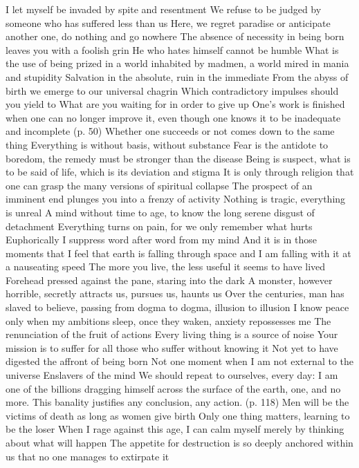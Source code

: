 \documentclass{article}
\begin{document}
I let myself be invaded by spite and resentment
We refuse to be judged by someone who has suffered less than us
Here, we regret paradise or anticipate another one, do nothing and go nowhere
The absence of necessity in being born leaves you with a foolish grin
He who hates himself cannot be humble
What is the use of being prized in a world inhabited by madmen, a world mired in mania and stupidity
Salvation in the absolute, ruin in the immediate
From the abyss of birth we emerge to our universal chagrin
Which contradictory impulses should you yield to
What are you waiting for in order to give up
One's work is finished when one can no longer improve it, even though one knows it to be inadequate and incomplete (p. 50)
Whether one succeeds or not comes down to the same thing
Everything is without basis, without substance
Fear is the antidote to boredom, the remedy must be stronger than the disease
Being is suspect, what is to be said of life, which is its deviation and stigma
It is only through religion that one can grasp the many versions of spiritual collapse
The prospect of an imminent end plunges you into a frenzy of activity
Nothing is tragic, everything is unreal
A mind without time to age, to know the long serene disgust of detachment
Everything turns on pain, for we only remember what hurts
Euphorically I suppress word after word from my mind
And it is in those moments that I feel that earth is falling through space and I am falling with it at a nauseating speed
The more you live, the less useful it seems to have lived
Forehead pressed against the pane, staring into the dark
A monster, however horrible, secretly attracts us, pursues us, haunts us
Over the centuries, man has slaved to believe, passing from dogma to dogma, illusion to illusion
I know peace only when my ambitions sleep, once they waken, anxiety repossesses me
The renunciation of the fruit of actions
Every living thing is a source of noise
Your mission is to suffer for all those who suffer without knowing it
Not yet to have digested the affront of being born
Not one moment when I am not external to the universe
Enslavers of the mind
We should repeat to ourselves, every day: I am one of the billions dragging himself across the surface of the earth, one, and no more. This banality justifies any conclusion, any action. (p. 118)
Men will be the victims of death as long as women give birth
Only one thing matters, learning to be the loser
When I rage against this age, I can calm myself merely by thinking about what will happen
The appetite for destruction is so deeply anchored within us that no one manages to extirpate it
\end{document}
